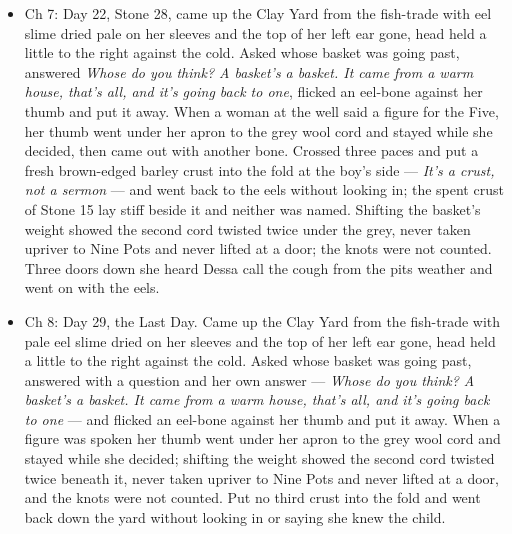 \documentclass{design/chronicle}
\begin{document}
{\begin{itemize}[leftmargin=1.4em,itemsep=1pt,topsep=3pt,parsep=0pt]
\item Ch 7: Day 22, Stone 28, came up the Clay Yard from the fish-trade with eel slime dried pale on her sleeves and the top of her left ear gone, head held a little to the right against the cold. Asked whose basket was going past, answered \emph{Whose do you think? A basket’s a basket. It came from a warm house, that’s all, and it’s going back to one}, flicked an eel-bone against her thumb and put it away. When a woman at the well said a figure for the Five, her thumb went under her apron to the grey wool cord and stayed while she decided, then came out with another bone. Crossed three paces and put a fresh brown-edged barley crust into the fold at the boy’s side --- \emph{It’s a crust, not a sermon} --- and went back to the eels without looking in; the spent crust of Stone 15 lay stiff beside it and neither was named. Shifting the basket’s weight showed the second cord twisted twice under the grey, never taken upriver to Nine Pots and never lifted at a door; the knots were not counted. Three doors down she heard Dessa call the cough from the pits weather and went on with the eels.

\end{itemize}

\begin{itemize}[leftmargin=1.4em,itemsep=1pt,topsep=3pt,parsep=0pt]

\item Ch 8: Day 29, the Last Day. Came up the Clay Yard from the fish-trade with pale eel slime dried on her sleeves and the top of her left ear gone, head held a little to the right against the cold. Asked whose basket was going past, answered with a question and her own answer --- \emph{Whose do you think? A basket’s a basket. It came from a warm house, that’s all, and it’s going back to one} --- and flicked an eel-bone against her thumb and put it away. When a figure was spoken her thumb went under her apron to the grey wool cord and stayed while she decided; shifting the weight showed the second cord twisted twice beneath it, never taken upriver to Nine Pots and never lifted at a door, and the knots were not counted. Put no third crust into the fold and went back down the yard without looking in or saying she knew the child.

\end{itemize}

\begin{itemize}[leftmargin=1.4em,itemsep=1pt,topsep=3pt,parsep=0pt]


\end{itemize}}
\end{document}
